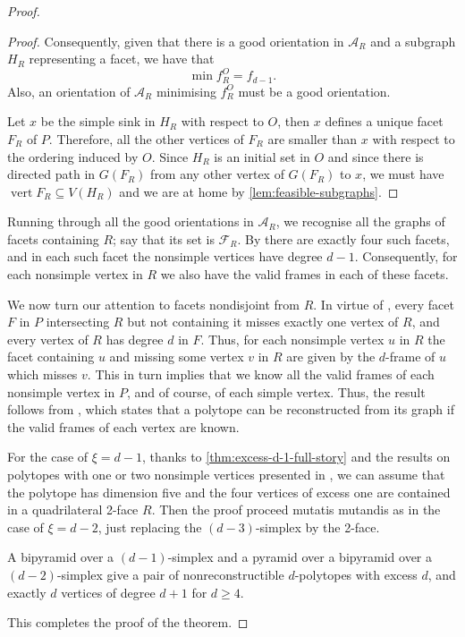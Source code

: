 \documentclass[a4paper]{amsart}
\theoremstyle{definition}
\theoremstyle{remark}
\begin{document}
\begin{proof}
\begin{proof}
Consequently, given that there is a good orientation in  $ \mathcal{A}_R$ and a subgraph $H_R$ representing a facet, we have that \[\min f^O_{R}=f_{d-1}.\]  Also, an orientation of $\mathcal{A}_R$ minimising $f_{R}^O$ must be a good orientation. 

 Let $x$ be the simple sink in $H_R$ with respect to $O$, then $x$ defines a unique facet $F_R$ of $P$. Therefore, all the other vertices of $F_R$ are smaller than $x$ with respect to the ordering induced by $O$. Since $H_R$ is an initial set in $O$ and since there is directed path in $G(F_R)$ from any other vertex of $G(F_R)$ to $x$,  we must have $\operatorname{vert} F_R \subseteq V(H_R)$ and we are at home by \cref{lem:feasible-subgraphs}. 
\end{proof}
	
Running through all the good orientations in  $\mathcal{A}_R$, we recognise all the graphs of facets containing $R$; say that its set is $\mathcal{F}_{R}$. By \cite[Lem.~4.5]{PinUgoYos16a} there are exactly four such facets, and in each such facet the nonsimple vertices have degree $d-1$. Consequently, for each nonsimple vertex in $R$ we also have the valid frames in each of these facets. 

We now turn our attention to facets nondisjoint from $R$. In virtue of \cite[Lem.~4.5]{PinUgoYos16a}, every facet $F$ in $P$ intersecting $R$ but not containing it misses exactly one vertex of $R$, and every vertex of $R$  has degree $d$ in $F$. Thus, for each nonsimple vertex $u$ in $R$ the facet containing $u$ and missing some vertex $v$ in $R$ are given by the $d$-frame of $u$ which misses $v$. This in turn implies that we know all the valid frames of each nonsimple vertex in $P$, and of course, of each simple vertex. Thus, the result follows from \cite[Thm.~2.3]{Jos00}, which states that a polytope can be reconstructed from its graph if the valid frames of each vertex are known.  

For the case of $\xi=d-1$, thanks to \cref{thm:excess-d-1-full-story} and the results on polytopes with one or two nonsimple vertices presented in \cite[Thms.~4.5-4.6]{NevPinUgo17}, we can assume that the polytope has dimension five and the four vertices of excess one are contained in a quadrilateral 2-face $R$. Then the proof proceed mutatis mutandis as in the case of $\xi=d-2$, just replacing the $(d-3)$-simplex by the 2-face. 

A bipyramid over a $(d-1)$-simplex and a pyramid over a bipyramid over a $(d-2)$-simplex give a pair  of nonreconstructible $d$-polytopes with excess $d$, and exactly $d$ vertices of degree $d+1$ for $d\ge 4$.

This completes the proof of the theorem.  
\end{proof}
\end{document}
